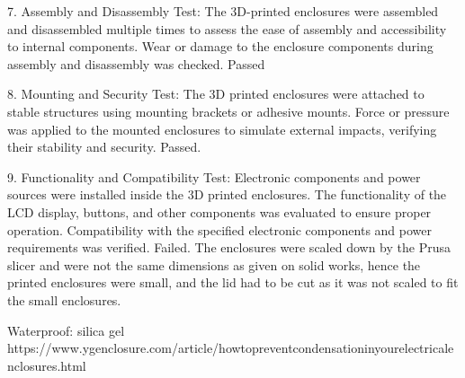 \documentclass[class=report,11pt,crop=false]{standalone}
\begin{document}
7. Assembly and Disassembly Test:
    The 3D-printed enclosures were assembled and disassembled multiple times to assess the ease of assembly and accessibility to internal components. Wear or damage to the enclosure components during assembly and disassembly was checked. Passed
    \newline

8. Mounting and Security Test:
 The 3D printed enclosures were attached to stable structures using mounting brackets or adhesive mounts. Force or pressure was applied to the mounted enclosures to simulate external impacts, verifying their stability and security. Passed. 
 \newline

9. Functionality and Compatibility Test:
Electronic components and power sources were installed inside the 3D printed enclosures. The functionality of the LCD display, buttons, and other components was evaluated to ensure proper operation. Compatibility with the specified electronic components and power requirements was verified.
Failed. The enclosures were scaled down by the Prusa slicer and were not the same dimensions as given on solid works, hence the printed enclosures were small, and the lid had to be cut as it was not scaled to fit the small enclosures. 
\newline


Waterproof: silica gel https://www.ygenclosure.com/article/howtopreventcondensationinyourelectricalenclosures.html






\ifstandalone

\printnoidxglossary[type=\acronymtype,nonumberlist]
\fi
\end{document}
